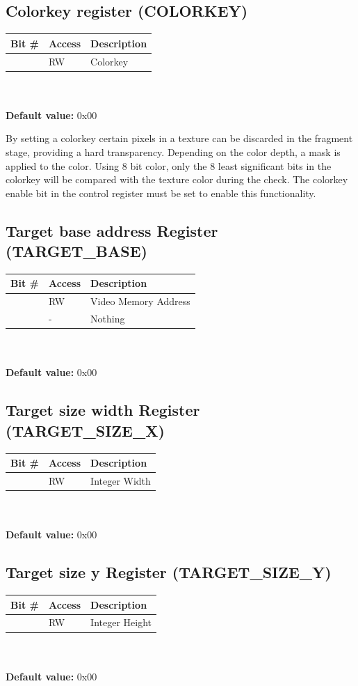 \documentclass[10pt,a4paper]{article}
\begin{document}
\subsection{Colorkey register (COLORKEY)}
\begin{tabular}{|l|l|l|}
\hline \textbf{Bit \#} & \textbf{Access} & \textbf{Description} \\ 
\hline
\hline [31:0] & RW & Colorkey \\
\hline 
\end{tabular}
\\\\
\textbf{Default value:} 0x00

By setting a colorkey certain pixels in a texture can be discarded in the fragment stage, providing a hard transparency. Depending on the color depth, a mask is applied to the color. Using 8 bit color, only the 8 least significant bits in the colorkey will be compared with the texture color during the check. The colorkey enable bit in the control register must be set to enable this functionality.


\subsection{Target base address Register (TARGET\_BASE)}
\begin{tabular}{|l|l|l|}
\hline \textbf{Bit \#} & \textbf{Access} & \textbf{Description} \\ 
\hline
\hline [31:2] & RW & Video Memory Address \\
\hline [1:0] & - & Nothing \\
\hline 
\end{tabular}
\\\\
\textbf{Default value:} 0x00

\subsection{Target size width Register (TARGET\_SIZE\_X)}
\begin{tabular}{|l|l|l|}
\hline \textbf{Bit \#} & \textbf{Access} & \textbf{Description} \\ 
\hline
\hline [31:0] & RW & Integer Width \\
\hline 
\end{tabular}
\\\\
\textbf{Default value:} 0x00

\subsection{Target size y Register (TARGET\_SIZE\_Y)}
\begin{tabular}{|l|l|l|}
\hline \textbf{Bit \#} & \textbf{Access} & \textbf{Description} \\ 
\hline
\hline [31:0] & RW & Integer Height \\
\hline 
\end{tabular}
\\\\
\textbf{Default value:} 0x00
\end{document}
